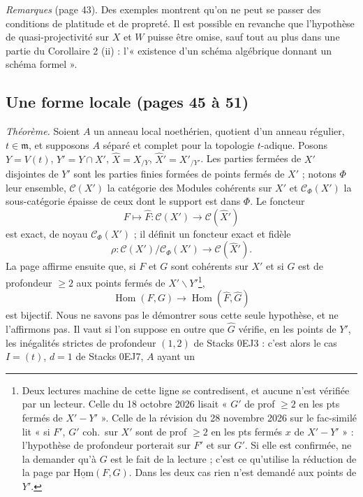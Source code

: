 \documentclass[11pt,a4paper]{article}
\begin{document}
\emph{Remarques} (page 43). Des exemples montrent qu'on ne peut se passer des conditions de
platitude et de propreté. Il est possible en revanche que
l'hypothèse de quasi-projectivité sur $X$ et $W$ puisse être omise, sauf tout
au plus dans une partie du Corollaire 2 (ii) : l'« existence d'un schéma
algébrique donnant un schéma formel ».

\subsection*{Une forme locale (pages 45 à 51)}

\emph{Théorème.} Soient $A$ un anneau local noethérien, quotient d'un anneau
régulier, $t \in \mathfrak{m}$, et supposons $A$ séparé et complet pour la
topologie $t$-adique. Posons $Y = V(t)$, $Y' = Y \cap X'$,
$\widehat{X} = X_{/Y}$, $\widehat{X}' = X'_{/Y'}$. Les parties fermées de $X'$
disjointes de $Y'$ sont les parties finies formées de points fermés de $X'$ ;
notons $\Phi$ leur ensemble, $\mathcal{C}(X')$ la catégorie des Modules
cohérents sur $X'$ et $\mathcal{C}_\Phi(X')$ la sous-catégorie épaisse de ceux
dont le support est dans $\Phi$. Le foncteur
\[
  F \longmapsto \widehat{F} : \mathcal{C}(X') \longrightarrow \mathcal{C}(\widehat{X}')
\]
est exact, de noyau $\mathcal{C}_\Phi(X')$ ; il définit un foncteur exact et
fidèle
\[
  \rho : \mathcal{C}(X') / \mathcal{C}_\Phi(X') \longrightarrow \mathcal{C}(\widehat{X}') .
\]
La page affirme ensuite que, si $F$ et $G$ sont cohérents sur $X'$ et si $G$
est de profondeur $\geq 2$ aux points fermés de
$X' \smallsetminus Y'$\footnote{Deux lectures machine de cette ligne se
contredisent, et aucune n'est vérifiée par un lecteur. Celle du 18 octobre
2026 lisait « $G'$ de prof $\geq 2$ en les pts fermés de $X' - Y'$ ». Celle de
la révision du 28 novembre 2026 sur le fac-similé lit « si $F'$, $G'$ coh.\ sur
$X'$ sont de prof $\geq 2$ en les pts fermés $x$ de $X' - Y'$ » : l'hypothèse
de profondeur porterait sur $F'$ et sur $G'$. Si elle est confirmée, ne la
demander qu'à $G$ est le fait de la lecture ; c'est ce qu'utilise la réduction
de la page par $\underline{\mathrm{Hom}}(F, G)$. Dans les deux cas rien n'est
demandé aux points de $Y'$.},
\[
  \operatorname{Hom}(F, G) \longrightarrow \operatorname{Hom}(\widehat{F}, \widehat{G})
\]
est bijectif. Nous ne savons pas le démontrer sous cette seule hypothèse, et ne
l'affirmons pas. Il vaut si l'on suppose en outre que $\widehat{G}$ vérifie, en
les points de $Y'$, les inégalités strictes de profondeur $(1, 2)$ de Stacks
0EJ3 : c'est alors le cas $I = (t)$, $d = 1$ de Stacks 0EJ7, $A$ ayant un
\end{document}
